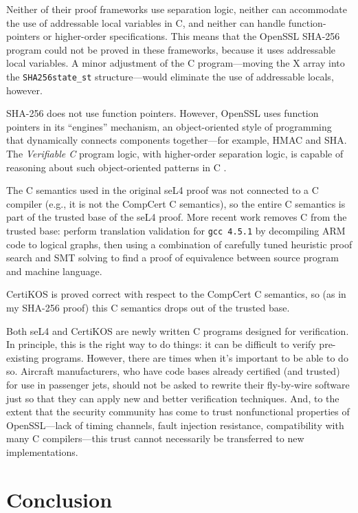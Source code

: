 \documentclass[prodmode,acmtoplas]{acmsmall}
\begin{document}
Neither of their proof frameworks use separation logic,
neither can accommodate the use of addressable local variables
in C, and neither can handle function-pointers or higher-order
specifications.  This means that the OpenSSL SHA-256 program
could not be proved in these frameworks, because it uses
addressable local variables.  A minor
adjustment of the C program---moving the X array into 
the \lstinline{SHA256state_st} structure---would
eliminate the use of addressable locals, however.

SHA-256 does not use function pointers.
However, OpenSSL uses function pointers
in its ``engines'' mechanism, an object-oriented style
of programming that dynamically connects components together---for 
example, HMAC and SHA.  The \emph{Verifiable C} program logic,
with higher-order separation logic, is capable of reasoning
about such object-oriented patterns in C \cite[Chapter 29]{appel14:plcc}.

The C semantics used in the original seL4 proof was not connected to a
C compiler (e.g., it is not the CompCert C semantics), so the entire C
semantics is part of the trusted base of the seL4 proof.  More recent
work removes C from the trusted base:
perform translation validation for \texttt{gcc 4.5.1}
by decompiling ARM code to logical graphs, then using a combination of
carefully tuned heuristic proof search and SMT solving to find a proof
of equivalence between source program and machine language.

CertiKOS is proved correct with respect to the CompCert C semantics,
so (as in my SHA-256 proof) this C semantics drops out of the trusted base.

Both seL4 and CertiKOS are newly written C programs designed for
verification.  In principle, this is the right way to do things:
it can be difficult to verify pre-existing programs.
However, there are times when it's important to be
able to do so.  Aircraft manufacturers, who have code bases already
certified (and trusted) for use in passenger jets,
should not be asked to rewrite their fly-by-wire software
just so that they can apply new and better verification techniques.
And, to the extent that the security community has come to trust
nonfunctional properties of OpenSSL---lack of timing channels,
fault injection resistance, compatibility with many C compilers---this
trust cannot necessarily be transferred to new implementations.

\section{Conclusion}
\end{document}
